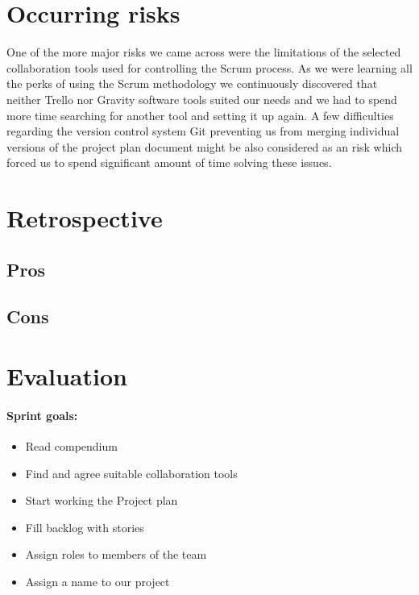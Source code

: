 \section{Occurring risks}

One of the more major risks we came across were the limitations of the selected collaboration tools used for controlling the Scrum process. As we were learning all the perks of using the Scrum methodology we continuously discovered that neither Trello nor Gravity software tools suited our needs and we had to spend more time searching for another tool and setting it up again. A few difficulties regarding the version control system Git preventing us from merging individual versions of the project plan document might be also considered as an risk which forced us to spend significant amount of time solving these issues.

\section{Retrospective}

\subsection{Pros}
\subsection{Cons}
\section{Evaluation}


\paragraph{Sprint goals:}
\begin{itemize}
    \item Read compendium
    \item Find and agree suitable collaboration tools
    \item Start working the Project plan
    \item Fill backlog with stories
    \item Assign roles to members of the team
    \item Assign a name to our project
\end{itemize}